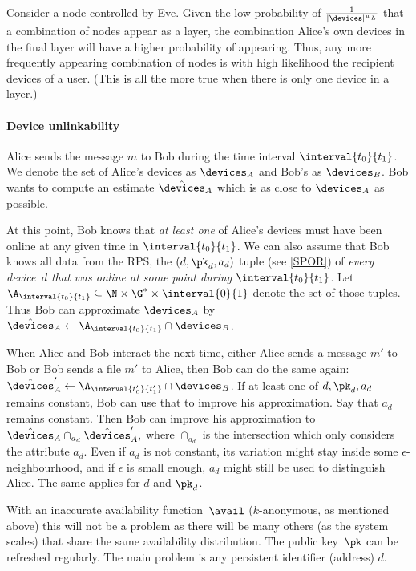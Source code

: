 Consider a node controlled by Eve.
Given the low probability of \(\frac{1}{|\devices|^{w_L}}\) that a combination 
of nodes appear as a layer, the combination Alice's own devices in the final 
layer will have a higher probability of appearing.
Thus, any more frequently appearing combination of nodes is with high 
likelihood the recipient devices of a user.
(This is all the more true when there is only one device in a layer.)

\paragraph*{Device unlinkability}

Alice sends the message \(m\) to Bob during the time interval 
\(\interval{t_0}{t_1}\).
We denote the set of Alice's devices as \(\devices_A\) and Bob's as 
\(\devices_B\).
Bob wants to compute an estimate \(\hat \devices_A\) which is as close to 
\(\devices_A\) as possible.

At this point, Bob knows that \emph{at least one} of Alice's devices must have 
been online at any given time in \(\interval{t_0}{t_1}\).
We can also assume that Bob knows all data from the \ac{RPS}, \ie the \((d, 
\pk_d, a_d)\) tuple (see \cref{SPOR}) of \emph{every device~\(d\) that was 
online at some point during \(\interval{t_0}{t_1}\)}.
Let \(\A_{\interval{t_0}{t_1}}\subseteq \N\times \G^*\times \interval{0}{1}\) 
denote the set of those tuples.
Thus Bob can approximate \(\devices_A\) by \(\hat \devices_A \gets 
\A_{\interval{t_0}{t_1}}\cap \devices_B\).

When Alice and Bob interact the next time, either Alice sends a message \(m'\) 
to Bob or Bob sends a file \(m'\) to Alice, then Bob can do the same again:
\(\hat \devices_A' \gets \A_{\interval{t_0'}{t_1'}} \cap \devices_B\).
If at least one of \(d, \pk_d, a_d\) remains constant, Bob can use that to 
improve his approximation.
Say that \(a_d\) remains constant.
Then Bob can improve his approximation to \(
  \hat \devices_A \cap_{a_d} \hat \devices_A',
\) where \(\cap_{a_d}\) is the intersection which only considers the attribute 
\(a_d\).
Even if \(a_d\) is not constant, its variation might stay inside some 
\(\epsilon\)-neighbourhood, and if \(\epsilon\) is small enough, \(a_d\) might 
still be used to distinguish Alice.
The same applies for \(d\) and \(\pk_d\).

With an inaccurate availability function~\(\avail\) (\eg \(k\)-anonymous, as 
mentioned above) this will not be a problem as there will be many others (as 
the system scales) that share the same availability distribution.
The public key~\(\pk\) can be refreshed regularly.
The main problem is any persistent identifier (address) \(d\).

